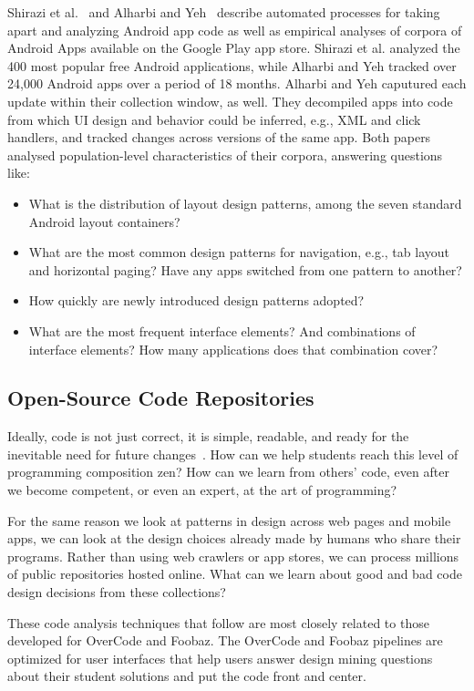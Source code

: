 Shirazi et al.~\cite{Shirazi} and Alharbi and Yeh~\cite{Alharbi} describe automated processes for taking apart and analyzing Android app code as well as empirical analyses of corpora of Android Apps available on the Google Play app store. Shirazi et al. analyzed the 400 most popular free Android applications, while Alharbi and Yeh tracked over 24,000 Android apps over a period of 18 months. Alharbi and Yeh caputured each update within their collection window, as well. They decompiled apps into code from which UI design and behavior could be inferred, e.g., XML and click handlers, and tracked changes across versions of the same app. Both papers analysed population-level characteristics of their corpora, answering questions like:
\begin{itemize}
\item     What is the distribution of layout design patterns, among the seven standard Android layout containers?
\item     What are the most common design patterns for navigation, e.g., tab layout and horizontal paging? Have any apps switched from one pattern to another?
\item     How quickly are newly introduced design patterns adopted?
\item     What are the most frequent interface elements? And combinations of interface elements? How many applications does that combination cover?
\end{itemize}

\subsection{Open-Source Code Repositories}

Ideally, code is not just correct, it is simple, readable, and ready for the inevitable need for future changes~\cite{peters2010zen,6005notes}. How can we help students reach this level of programming composition zen? How can we learn from others' code, even after we become competent, or even an expert, at the art of programming?

For the same reason we look at patterns in design across web pages and mobile apps, we can look at the design choices already made by humans who share their programs. Rather than using web crawlers or app stores, we can process millions of public repositories hosted online. What can we learn about good and bad code design decisions from these collections?

These code analysis techniques that follow are most closely related to those developed for OverCode and Foobaz. The OverCode and Foobaz pipelines are optimized for user interfaces that help users answer design mining questions about their student solutions and put the code front and center. %

